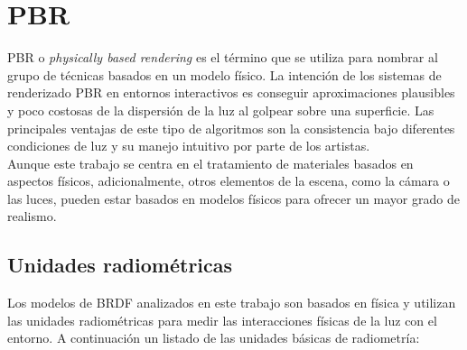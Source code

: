 \chapter{PBR}
PBR o \textit{physically based rendering} es el t\'ermino que se utiliza para nombrar al grupo de t\'ecnicas basados en un
modelo f\'isico. La intenci\'on de los sistemas de renderizado PBR en entornos interactivos es conseguir aproximaciones plausibles
y poco costosas de la dispersi\'on de la luz al golpear sobre una superficie. Las principales ventajas de este tipo de algoritmos
son la consistencia bajo diferentes condiciones de luz y su manejo intuitivo por parte de los artistas.\\


Aunque este trabajo se centra en el tratamiento de materiales basados en aspectos f\'isicos, adicionalmente, otros elementos
de la escena, como la c\'amara o las luces, pueden estar basados en modelos f\'isicos para ofrecer un mayor grado de realismo.

\section{Unidades radiom\'etricas}
    Los modelos de BRDF analizados en este trabajo son basados en f\'isica y utilizan las unidades radiom\'etricas para
    medir las interacciones f\'isicas de la luz con el entorno. A continuaci\'on un listado de las unidades
    b\'asicas de radiometr\'ia:

